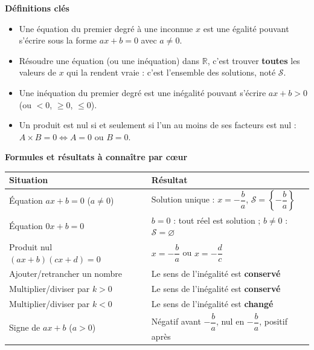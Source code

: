 \documentclass[11pt]{article}
\newcommand{\cle}[1]{{\popxbold\color{popdark}#1}}
\begin{document}
\begin{bilan}
\textbf{Définitions clés}
\begin{itemize}
\item Une \cle{équation du premier degré} à une inconnue $x$ est une égalité pouvant s'écrire sous la forme $ax+b=0$ avec $a\neq 0$.
\item \cle{Résoudre} une équation (ou une inéquation) dans $\mathbb{R}$, c'est trouver \textbf{toutes} les valeurs de $x$ qui la rendent vraie : c'est l'\cle{ensemble des solutions}, noté $\mathcal{S}$.
\item Une \cle{inéquation du premier degré} est une inégalité pouvant s'écrire $ax+b>0$ (ou $<0$, $\geq 0$, $\leq 0$).
\item Un \cle{produit est nul} si et seulement si l'un au moins de ses facteurs est nul : $A\times B=0 \iff A=0$ ou $B=0$.
\end{itemize}

\textbf{Formules et résultats à connaître par cœur}
\begin{center}
\begin{tabularx}{\linewidth}{|l|X|}
\hline
\rowcolor{popblueL} \textbf{Situation} & \textbf{Résultat} \\
\hline
Équation $ax+b=0$ ($a\neq 0$) & Solution unique : $x=-\dfrac{b}{a}$, \; $\mathcal{S}=\left\{-\dfrac{b}{a}\right\}$ \\
\hline
Équation $0x+b=0$ & $b=0$ : tout réel est solution ; $b\neq 0$ : $\mathcal{S}=\varnothing$ \\
\hline
Produit nul $(ax+b)(cx+d)=0$ & $x=-\dfrac{b}{a}$ ou $x=-\dfrac{d}{c}$ \\
\hline
Ajouter/retrancher un nombre & Le sens de l'inégalité est \textbf{conservé} \\
\hline
Multiplier/diviser par $k>0$ & Le sens de l'inégalité est \textbf{conservé} \\
\hline
Multiplier/diviser par $k<0$ & Le sens de l'inégalité est \textbf{changé} \\
\hline
Signe de $ax+b$ ($a>0$) & Négatif avant $-\dfrac{b}{a}$, nul en $-\dfrac{b}{a}$, positif après \\
\hline
\end{tabularx}
\end{center}


\end{bilan}
\end{document}
